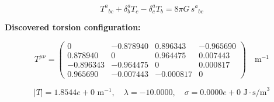 
\begin{equation}
  T^a{}_{bc} + \delta^a_b T_c - \delta^a_c T_b = 8\pi G \, s^a{}_{bc}
\end{equation}

\textbf{Discovered torsion configuration:}

\begin{equation}
  T^{\mu\nu} = \begin{pmatrix}
    0 & -0.878940 & 0.896343 & -0.965690 \\
    0.878940 & 0 & 0.964475 & 0.007443 \\
    -0.896343 & -0.964475 & 0 & 0.000817 \\
    0.965690 & -0.007443 & -0.000817 & 0
  \end{pmatrix} \quad \text{m}^{-1}
\end{equation}

\begin{equation}
  |T| = 1.8544e+0 \text{ m}^{-1}, \quad
  \lambda = -10.0000, \quad
  \sigma = 0.0000e+0 \text{ J}\cdot\text{s/m}^3
\end{equation}